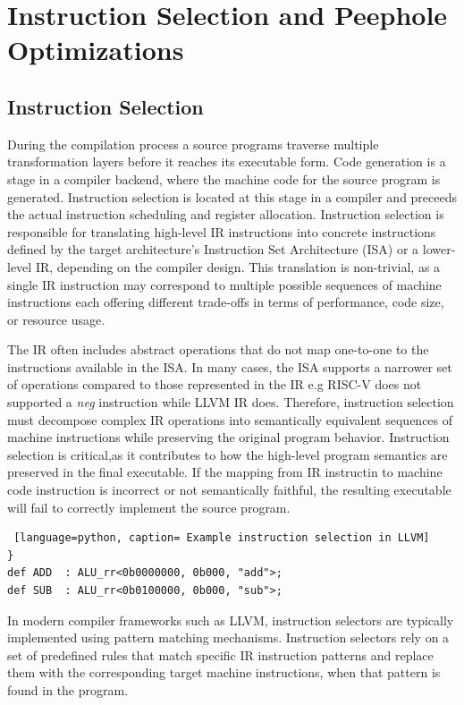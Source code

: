 \section{Instruction Selection and Peephole Optimizations } 

\subsection{Instruction Selection} 

During the compilation process a source programs traverse multiple transformation layers before it reaches its executable form. Code generation is a stage in a compiler backend, where the machine code for the source program is generated. Instruction selection is located at this stage in a compiler and preceeds the actual instruction scheduling and register allocation. Instruction selection is responsible for translating high-level IR instructions into concrete instructions defined by the target architecture's Instruction Set Architecture (ISA) or a lower-level IR, depending on the compiler design. This translation is non-trivial, as a single IR instruction may correspond to multiple possible sequences of machine instructions each offering different trade-offs in terms of performance, code size, or resource usage.

The IR often includes abstract operations that do not map one-to-one to the instructions available in the ISA. In many cases, the ISA supports a narrower set of operations compared to those represented in the IR e.g RISC-V does not supported a \textit{neg }instruction while LLVM IR does. Therefore, instruction selection must decompose complex IR operations into semantically equivalent sequences of machine instructions while preserving the original program behavior.
Instruction selection is critical,as it contributes to how the high-level program semantics are preserved in the final executable. If the mapping from IR instructin to machine code instruction is incorrect or not semantically faithful, the resulting executable will fail to correctly implement the source program. 

\begin{lstlisting} [language=python, caption= Example instruction selection in LLVM]
}
def ADD  : ALU_rr<0b0000000, 0b000, "add">;
def SUB  : ALU_rr<0b0100000, 0b000, "sub">;

\end{lstlisting}
In modern compiler frameworks such as LLVM, instruction selectors are typically implemented using pattern matching mechanisms. Instruction selectors rely on a set of predefined rules that match specific IR instruction patterns and replace them with the corresponding target machine instructions, when that pattern is found in the program.

